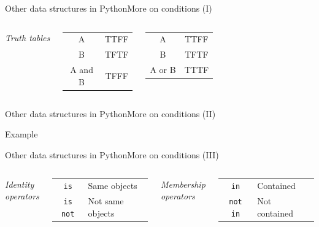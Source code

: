 \documentclass[10pt,compress]{beamer} %
\begin{document}
{\begin{frame}{Other data structures in Python}{More on conditions (I)}
\begin{columns}
        \bigskip

		\centering \textit{Truth tables}
		\smallskip
    	\begin{columns}
		\footnotesize{
		\centering \begin{tabular}{|c|c|}\hline
		A	   &TTFF \\
		B 	   &TFTF \\\hline
		A and B &TFFF \\\hline
		\end{tabular}
		}
		\footnotesize{
		\centering \begin{tabular}{|c|c|}\hline
		A	 &TTFF \\
		B 	 &TFTF \\\hline
		A or B &TTTF \\\hline
		\end{tabular}
		}
		\end{columns}
	\end{columns}
\end{frame}

\begin{frame}{Other data structures in Python}{More on conditions (II)}
	\begin{exampleblock}{Example}
		\vspace{-0.2cm}
		
		\vspace{-0.2cm}
	\end{exampleblock}
\end{frame}

\begin{frame}{Other data structures in Python}{More on conditions (III)}
    \begin{columns}
		\centering \textit{Identity operators}
		\centering \begin{tabular}{cl}
		\texttt{is} 	& Same objects 	 \\
		\texttt{is not} & Not same objects \\
		\end{tabular}
		
		\bigskip
		\centering \textit{Membership operators}
		\centering \begin{tabular}{cl}
		\texttt{in} 	& Contained    \\
		\texttt{not in}	& Not contained\\
		\end{tabular}


\end{columns}
\end{frame}}
\end{document}
